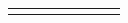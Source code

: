 \begin{center}
\begin{xtabular*}{\mytablewidth}[t]{|p{10\mystarwidth}|p{10\mystarwidth}|p{10\mystarwidth}|p{10\mystarwidth}|p{10\mystarwidth}|p{10\mystarwidth}|p{10\mystarwidth}|p{10\mystarwidth}|}
    
         &
    
    
         &
    
    
         &
    
    
         &
    
    
         &
    
    
         &
    
    

\end{xtabular*}
\end{center}
